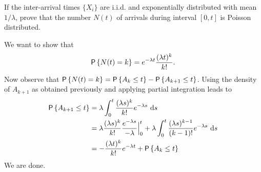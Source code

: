 \begin{question}
  If the inter-arrival times $\{X_i\}$ are i.i.d. and exponentially
  distributed with mean $1/\lambda$, prove that the number $N(t)$ of
  arrivals during interval $[0,t]$ is Poisson distributed.
  \begin{hint}
  \end{hint}
    \begin{solution}
      We want to show that
    \begin{equation*}
      \P{N(t)=k} = e^{-\lambda t}\frac{(\lambda t)^k}{k!}.
    \end{equation*}
    Now observe that
    $\P{N(t)=k} = \P{A_k \leq t} - \P{A_{k+1} \leq t}$.  Using the
    density of $A_{k+1}$ as obtained previously and applying partial
    integration leads to
\begin{equation*}
  \begin{split}
\P{A_{k+1} \leq t} 
&= \lambda \int_0^t \frac{(\lambda s)^{k}}{k!}e^{-\lambda s}\, \d s \\
&= \lambda \frac{(\lambda s)^{k}}{k!}\frac{e^{-\lambda s}}{-\lambda} \Big|_{0}^t + \lambda \int_0^t \frac{(\lambda s)^{k-1}}{(k-1)!}e^{-\lambda s}\, \d s \\
&= - \frac{(\lambda t)^{k}}{k!} e^{-\lambda t} + \P{A_k \leq t}
  \end{split}
\end{equation*}
We are done.
    \end{solution}
\end{question}



